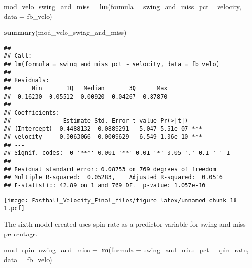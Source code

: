 \documentclass[]{article}
\newenvironment{Shaded}{\begin{snugshade}}{\end{snugshade}}
\newcommand{\KeywordTok}[1]{\textcolor[rgb]{0.13,0.29,0.53}{\textbf{#1}}}
\newcommand{\DataTypeTok}[1]{\textcolor[rgb]{0.13,0.29,0.53}{#1}}
\newcommand{\StringTok}[1]{\textcolor[rgb]{0.31,0.60,0.02}{#1}}
\newcommand{\OperatorTok}[1]{\textcolor[rgb]{0.81,0.36,0.00}{\textbf{#1}}}
\newcommand{\NormalTok}[1]{#1}
\begin{document}
\begin{Shaded}
\begin{Highlighting}[]
\NormalTok{mod_velo_swing_and_miss =}\StringTok{  }\KeywordTok{lm}\NormalTok{(}\DataTypeTok{formula =}\NormalTok{ swing_and_miss_pct }\OperatorTok{~}\StringTok{ }\NormalTok{velocity, }\DataTypeTok{data =}\NormalTok{ fb_velo)}
\end{Highlighting}
\end{Shaded}

\begin{Shaded}
\begin{Highlighting}[]
\KeywordTok{summary}\NormalTok{(mod_velo_swing_and_miss)}
\end{Highlighting}
\end{Shaded}

\begin{verbatim}
## 
## Call:
## lm(formula = swing_and_miss_pct ~ velocity, data = fb_velo)
## 
## Residuals:
##      Min       1Q   Median       3Q      Max 
## -0.16230 -0.05512 -0.00920  0.04267  0.87870 
## 
## Coefficients:
##               Estimate Std. Error t value Pr(>|t|)    
## (Intercept) -0.4488132  0.0889291  -5.047 5.61e-07 ***
## velocity     0.0063066  0.0009629   6.549 1.06e-10 ***
## ---
## Signif. codes:  0 '***' 0.001 '**' 0.01 '*' 0.05 '.' 0.1 ' ' 1
## 
## Residual standard error: 0.08753 on 769 degrees of freedom
## Multiple R-squared:  0.05283,    Adjusted R-squared:  0.0516 
## F-statistic: 42.89 on 1 and 769 DF,  p-value: 1.057e-10
\end{verbatim}

\begin{Shaded}
\end{Shaded}

\texttt{[image: Fastball\_Velocity\_Final\_files/figure-latex/unnamed-chunk-18-1.pdf]}

The sixth model created uses spin rate as a predictor variable for swing
and miss percentage.

\begin{Shaded}
\begin{Highlighting}[]
\NormalTok{mod_spin_swing_and_miss =}\StringTok{  }\KeywordTok{lm}\NormalTok{(}\DataTypeTok{formula =}\NormalTok{ swing_and_miss_pct }\OperatorTok{~}\StringTok{ }\NormalTok{spin_rate, }\DataTypeTok{data =}\NormalTok{ fb_velo)}
\end{Highlighting}
\end{Shaded}
\end{document}
